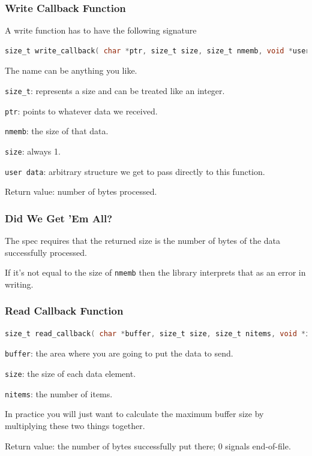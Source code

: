 \begin{frame}[fragile]
	\frametitle{Write Callback Function}

	A write function has to have the following signature
	\begin{lstlisting}[language=C]
size_t write_callback( char *ptr, size_t size, size_t nmemb, void *userdata );
\end{lstlisting}

	The name can be anything you like.

	\texttt{size\_t}: represents a size and can be treated like an integer.

	\texttt{ptr}: points to whatever data we received.

	\texttt{nmemb}: the size of that data.

	\texttt{size}: always 1.

	\texttt{user data}: arbitrary structure we get to pass directly to this function.

	Return value: number of bytes processed.

\end{frame}

\begin{frame}
	\frametitle{Did We Get 'Em All?}

	The spec requires that the returned size is the number of bytes of the data successfully processed.

	If it's not equal to the size of \texttt{nmemb} then the library interprets that as an error in writing.

\end{frame}



\begin{frame}[fragile]
	\frametitle{Read Callback Function}

	\begin{lstlisting}[language=C]
size_t read_callback( char *buffer, size_t size, size_t nitems, void *inputdata );
\end{lstlisting}


	\texttt{buffer}: the area where you are going to put the data to send.

	\texttt{size}: the size of each data element.

	\texttt{nitems}: the number of items.

	In practice you will just want to calculate the maximum buffer size by multiplying these two things together.

	Return value: the number of bytes successfully put there; 0 signals end-of-file.

\end{frame}




